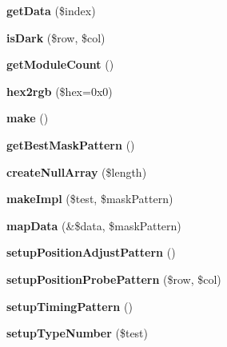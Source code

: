 \begin{DoxyCompactItemize}
{\bfseries get\+Data} (\$index)
\item 
\mbox{\label{class_q_r_code_a685c6a2ed61374ea94f0306ced9ecc89}} 
{\bfseries is\+Dark} (\$row, \$col)
\item 
\mbox{\label{class_q_r_code_a6dd49aa651831ce290e2c64160f9e28e}} 
{\bfseries get\+Module\+Count} ()
\item 
\mbox{\label{class_q_r_code_ae983a5412abfa7bdba17ace2cb9990a1}} 
{\bfseries hex2rgb} (\$hex=0x0)
\item 
\mbox{\label{class_q_r_code_ac31c88038a2856982476b30b27db5204}} 
{\bfseries make} ()
\item 
\mbox{\label{class_q_r_code_adc7fe35db0241b11977d67e55bf53080}} 
{\bfseries get\+Best\+Mask\+Pattern} ()
\item 
\mbox{\label{class_q_r_code_a2175381fb287b05b11c3e1b91951582b}} 
{\bfseries create\+Null\+Array} (\$length)
\item 
\mbox{\label{class_q_r_code_a0238679df41f990f704bf12fa89e0dbc}} 
{\bfseries make\+Impl} (\$test, \$mask\+Pattern)
\item 
\mbox{\label{class_q_r_code_a740580963fccf394179cfd3001fbd9f5}} 
{\bfseries map\+Data} (\&\$data, \$mask\+Pattern)
\item 
\mbox{\label{class_q_r_code_a743da898541d89cb0c8ae288bb127762}} 
{\bfseries setup\+Position\+Adjust\+Pattern} ()
\item 
\mbox{\label{class_q_r_code_a151bdc46852b128c920ecde90bb2009d}} 
{\bfseries setup\+Position\+Probe\+Pattern} (\$row, \$col)
\item 
\mbox{\label{class_q_r_code_a2442e1c3e6ccad5363d8d25fb1a4e9ca}} 
{\bfseries setup\+Timing\+Pattern} ()
\item 
\mbox{\label{class_q_r_code_a658305d302d6aff6bb84dba4fe1e11c7}} 
{\bfseries setup\+Type\+Number} (\$test)

\end{DoxyCompactItemize}
